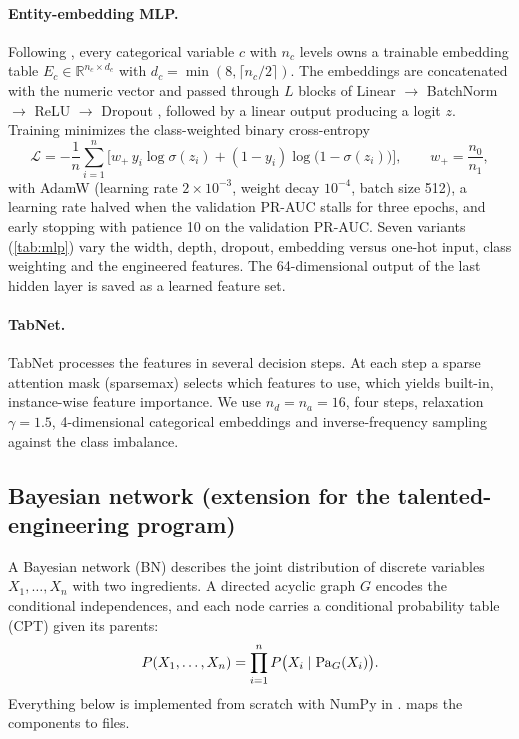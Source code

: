 \paragraph{Entity-embedding MLP.}
Following \cite{entity_embeddings}, every categorical variable $c$ with $n_c$ levels owns a trainable embedding table $E_c \in \mathbb{R}^{n_c \times d_c}$ with $d_c = \min(8, \lceil n_c / 2 \rceil)$.
The embeddings are concatenated with the numeric vector and passed through $L$ blocks of Linear $\to$ BatchNorm \cite{batchnorm} $\to$ ReLU $\to$ Dropout \cite{dropout}, followed by a linear output producing a logit $z$.
Training minimizes the class-weighted binary cross-entropy
\begin{equation}
  \mathcal{L} = -\frac{1}{n}\sum_{i=1}^n \Big[ w_+ \, y_i \log \sigma(z_i) + (1 - y_i) \log\big(1 - \sigma(z_i)\big) \Big],
  \qquad w_+ = \frac{n_0}{n_1},
\end{equation}
with AdamW \cite{adamw} (learning rate $2\times10^{-3}$, weight decay $10^{-4}$, batch size 512), a learning rate halved when the validation PR-AUC stalls for three epochs, and early stopping with patience 10 on the validation PR-AUC.
Seven variants (\cref{tab:mlp}) vary the width, depth, dropout, embedding versus one-hot input, class weighting and the engineered features.
The 64-dimensional output of the last hidden layer is saved as a learned feature set.

\paragraph{TabNet.}
TabNet \cite{tabnet} processes the features in several decision steps.
At each step a sparse attention mask (sparsemax) selects which features to use, which yields built-in, instance-wise feature importance.
We use $n_d = n_a = 16$, four steps, relaxation $\gamma = 1.5$, 4-dimensional categorical embeddings and inverse-frequency sampling against the class imbalance.

\subsection{Bayesian network (extension for the talented-engineering program)}
\label{subsec:bn}

A Bayesian network (BN) \cite{koller2009} describes the joint distribution of discrete variables $X_1, \dots, X_n$ with two ingredients.
A directed acyclic graph $G$ encodes the conditional independences, and each node carries a conditional probability table (CPT) given its parents:
\begin{equation}
  P(X_1, \dots, X_n) = \prod_{i=1}^{n} P\big(X_i \mid \operatorname{Pa}_G(X_i)\big).
  \label{eq:bn_factorization}
\end{equation}
Everything below is implemented from scratch with NumPy in .
 maps the components to files.

